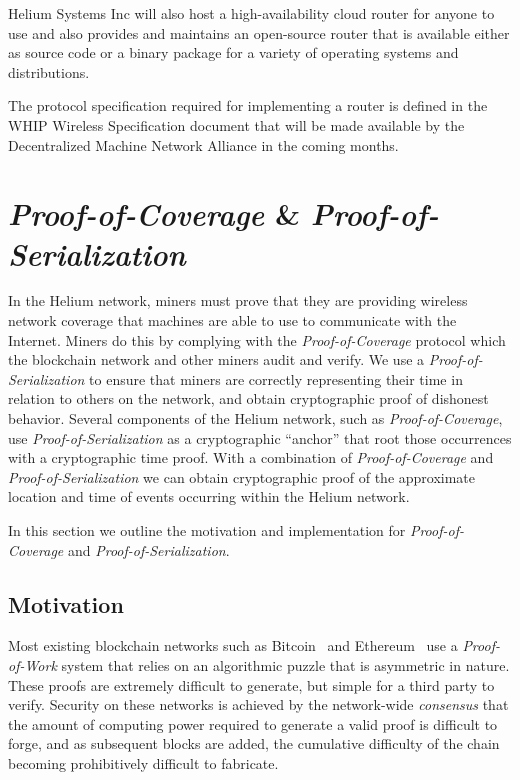 \documentclass[10pt, nonatbib, nocopyrightspace, reprint]{sigplanconf}
\begin{document}
Helium Systems Inc will also host a high-availability cloud router for anyone to use and also provides and maintains an open-source router that is available either as source code or a binary package for a variety of operating systems and distributions.

The protocol specification required for implementing a router is defined in the WHIP Wireless Specification document that will be made available by the Decentralized Machine Network Alliance in the coming months.

\section{\emph{Proof-of-Coverage} \& \emph{Proof-of-Serialization}}\label{poc}

In the Helium network, miners must prove that they are providing wireless network coverage that machines are able to use to communicate with the Internet. Miners do this by complying with the \emph{Proof-of-Coverage} protocol which the blockchain network and other miners audit and verify. We use a \emph{Proof-of-Serialization} to ensure that miners are correctly representing their time in relation to others on the network, and obtain cryptographic proof of dishonest behavior. Several components of the Helium network, such as \emph{Proof-of-Coverage}, use \emph{Proof-of-Serialization} as a cryptographic ``anchor'' that root those occurrences  with a cryptographic time proof. With a combination of \emph{Proof-of-Coverage} and \emph{Proof-of-Serialization} we can obtain cryptographic proof of the approximate location and time of events occurring within the Helium network.

In this section we outline the motivation and implementation for \emph{Proof-of-Coverage} and \emph{Proof-of-Serialization}.

\subsection{Motivation}

Most existing blockchain networks such as Bitcoin~\cite{bitcoin} and Ethereum~\cite{ethereum} use a \emph{Proof-of-Work} system that relies on an algorithmic puzzle that is asymmetric in nature. These proofs are extremely difficult to generate, but simple for a third party to verify. Security on these networks is achieved by the network-wide \emph{consensus} that the amount of computing power required to generate a valid proof is difficult to forge, and as subsequent blocks are added, the cumulative difficulty of the chain becoming prohibitively difficult to fabricate.
\end{document}
